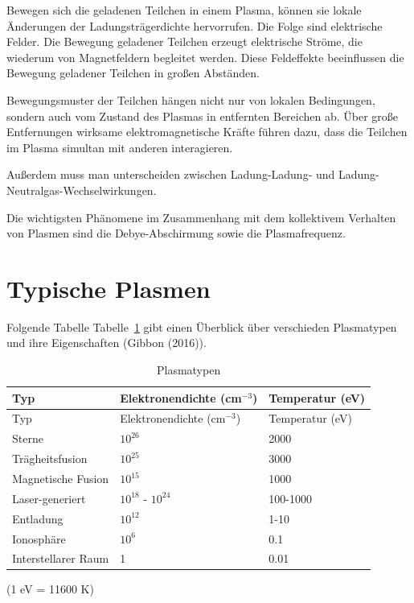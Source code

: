 \documentclass[
  a4paper,
  DIV=11]{scrreprt}
\begin{document}
Bewegen sich die geladenen Teilchen in einem Plasma, können sie lokale
Änderungen der Ladungsträgerdichte hervorrufen. Die Folge sind
elektrische Felder. Die Bewegung geladener Teilchen erzeugt elektrische
Ströme, die wiederum von Magnetfeldern begleitet werden. Diese
Feldeffekte beeinflussen die Bewegung geladener Teilchen in großen
Abständen.

Bewegungsmuster der Teilchen hängen nicht nur von lokalen Bedingungen,
sondern auch vom Zustand des Plasmas in entfernten Bereichen ab. Über
große Entfernungen wirksame elektromagnetische Kräfte führen dazu, dass
die Teilchen im Plasma simultan mit anderen interagieren.

Außerdem muss man unterscheiden zwischen Ladung-Ladung- und
Ladung-Neutralgas-Wechselwirkungen.

Die wichtigsten Phänomene im Zusammenhang mit dem kollektivem Verhalten
von Plasmen sind die Debye-Abschirmung sowie die Plasmafrequenz.

\hypertarget{typische-plasmen}{%
\section{Typische Plasmen}\label{typische-plasmen}}

Folgende Tabelle Tabelle~\ref{tbl-typen} gibt einen Überblick über
verschieden Plasmatypen und ihre Eigenschaften (Gibbon (2016)).

\hypertarget{tbl-typen}{}
\begin{longtable}[]{@{}lll@{}}
\caption{\label{tbl-typen}Plasmatypen}\tabularnewline
\toprule()
Typ & Elektronendichte (cm\(^{-3}\)) & Temperatur (eV) \\
\midrule()
\endfirsthead
\toprule()
Typ & Elektronendichte (cm\(^{-3}\)) & Temperatur (eV) \\
\midrule()
\endhead
Sterne & \(10^{26}\) & 2000 \\
Trägheitsfusion & \(10^{25}\) & 3000 \\
Magnetische Fusion & \(10^{15}\) & 1000 \\
Laser-generiert & \(10^{18}\) - \(10^{24}\) & 100-1000 \\
Entladung & \(10^{12}\) & 1-10 \\
Ionosphäre & \(10^{6}\) & 0.1 \\
Interstellarer Raum & 1 & 0.01 \\
\bottomrule()
\end{longtable}

(1 eV = 11600 K)
\end{document}
